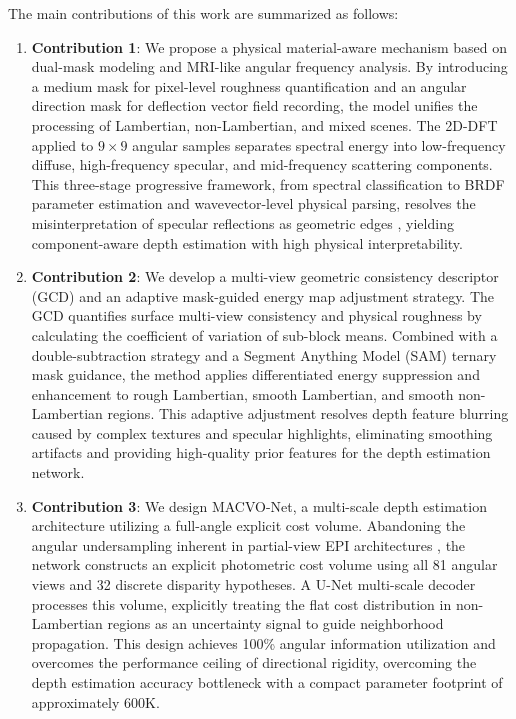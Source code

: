 \documentclass[lettersize,journal]{IEEEtran}
\begin{document}
The main contributions of this work are summarized as follows:
\begin{enumerate}
    \item \textbf{Contribution 1}: We propose a physical material-aware mechanism based on dual-mask modeling and MRI-like angular frequency analysis. By introducing a medium mask for pixel-level roughness quantification and an angular direction mask for deflection vector field recording, the model unifies the processing of Lambertian, non-Lambertian, and mixed scenes. The 2D-DFT applied to $9 \times 9$ angular samples separates spectral energy into low-frequency diffuse, high-frequency specular, and mid-frequency scattering components. This three-stage progressive framework, from spectral classification to BRDF parameter estimation and wavevector-level physical parsing, resolves the misinterpretation of specular reflections as geometric edges \cite{tao2013}, yielding component-aware depth estimation with high physical interpretability.
    
    \item \textbf{Contribution 2}: We develop a multi-view geometric consistency descriptor (GCD) and an adaptive mask-guided energy map adjustment strategy. The GCD quantifies surface multi-view consistency and physical roughness by calculating the coefficient of variation of sub-block means. Combined with a double-subtraction strategy and a Segment Anything Model (SAM) \cite{kirillov2023} ternary mask guidance, the method applies differentiated energy suppression and enhancement to rough Lambertian, smooth Lambertian, and smooth non-Lambertian regions. This adaptive adjustment resolves depth feature blurring caused by complex textures and specular highlights, eliminating smoothing artifacts and providing high-quality prior features for the depth estimation network.
    
    \item \textbf{Contribution 3}: We design MACVO-Net, a multi-scale depth estimation architecture utilizing a full-angle explicit cost volume. Abandoning the angular undersampling inherent in partial-view EPI architectures \cite{lyu2022}, the network constructs an explicit photometric cost volume using all 81 angular views and 32 discrete disparity hypotheses. A U-Net multi-scale decoder processes this volume, explicitly treating the flat cost distribution in non-Lambertian regions as an uncertainty signal to guide neighborhood propagation. This design achieves 100\% angular information utilization and overcomes the performance ceiling of directional rigidity, overcoming the depth estimation accuracy bottleneck with a compact parameter footprint of approximately 600K.
\end{enumerate}
\end{document}
